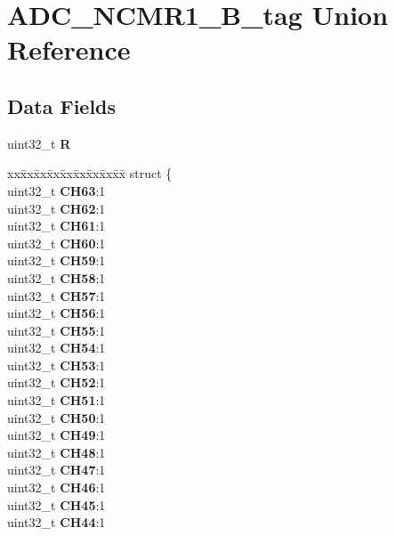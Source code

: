 \hypertarget{unionADC__NCMR1__32B__tag}{}\section{A\+D\+C\+\_\+\+N\+C\+M\+R1\+\_\+B\+\_\+tag Union Reference}
\label{unionADC__NCMR1__32B__tag}
\subsection*{Data Fields}
\begin{DoxyCompactItemize}
\item 
\mbox{\label{unionADC__NCMR1__32B__tag_a4b18a579306b088a6a4ad85ca1e78be6}} 
uint32\+\_\+t {\bfseries R}
\item 
\mbox{\label{unionADC__NCMR1__32B__tag_a4b1ebc512efaf23441d9459251d6af4e}} 
\begin{tabbing}
xx\=xx\=xx\=xx\=xx\=xx\=xx\=xx\=xx\=\kill
struct \{\\
\>uint32\_t {\bfseries CH63}:1\\
\>uint32\_t {\bfseries CH62}:1\\
\>uint32\_t {\bfseries CH61}:1\\
\>uint32\_t {\bfseries CH60}:1\\
\>uint32\_t {\bfseries CH59}:1\\
\>uint32\_t {\bfseries CH58}:1\\
\>uint32\_t {\bfseries CH57}:1\\
\>uint32\_t {\bfseries CH56}:1\\
\>uint32\_t {\bfseries CH55}:1\\
\>uint32\_t {\bfseries CH54}:1\\
\>uint32\_t {\bfseries CH53}:1\\
\>uint32\_t {\bfseries CH52}:1\\
\>uint32\_t {\bfseries CH51}:1\\
\>uint32\_t {\bfseries CH50}:1\\
\>uint32\_t {\bfseries CH49}:1\\
\>uint32\_t {\bfseries CH48}:1\\
\>uint32\_t {\bfseries CH47}:1\\
\>uint32\_t {\bfseries CH46}:1\\
\>uint32\_t {\bfseries CH45}:1\\
\>uint32\_t {\bfseries CH44}:1\\

\end{tabbing}
\end{DoxyCompactItemize}
